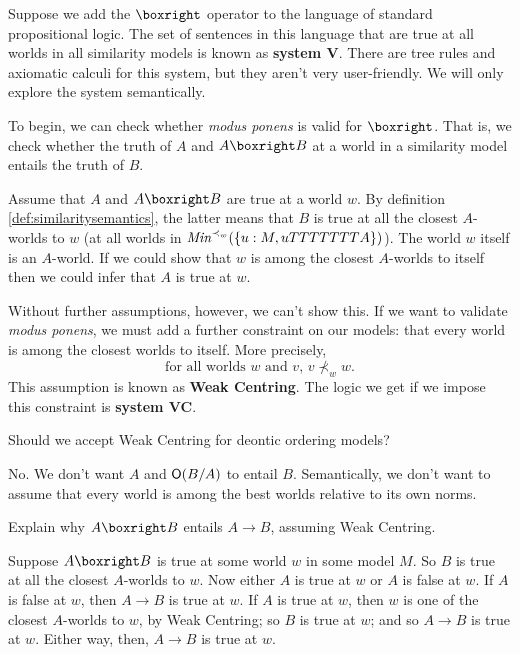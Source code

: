 Suppose we add the $\boxright$ operator to the language of standard
propositional logic. The set of sentences in this language that are true at all
worlds in all similarity models is known as \textbf{system V}. There are tree
rules and axiomatic calculi for this system, but they aren't very user-friendly.
We will only explore the system semantically.

To begin, we can check whether \emph{modus ponens} is valid for $\boxright$. That is,
we check whether the truth of $A$ and $A \boxright B$ at a world in a
similarity model entails the truth of $B$.

Assume that $A$ and $A \boxright B$ are true at a world $w$. By definition
\ref{def:similaritysemantics}, the latter means that $B$ is true at all the
closest $A$-worlds to $w$ (at all worlds in
$\emph{Min}^{\prec_w}(\{u: M,u\models A\})$). The world $w$ itself is an
$A$-world. If we could show that $w$ is among the closest $A$-worlds to itself
then we could infer that $A$ is true at $w$.

Without further assumptions, however, we can't show this. If we want to validate
\emph{modus ponens}, we must add a further constraint on our models: that every
world is among the closest worlds to itself. More precisely,
\[
  \text{for all worlds $w$ and $v$, $v \nprec_{w} w$.}
\]
This assumption is known as \textbf{Weak Centring}.
The logic we get if we impose this constraint is \textbf{system VC}.

\begin{exercise}
  Should we accept Weak Centring for deontic ordering models?
\end{exercise}
\begin{solution}
  No. We don't want $A$ and $\Ob(B/A)$ to entail $B$. Semantically, we don't
  want to assume that every world is among the best worlds relative to its own
  norms.
\end{solution}

\begin{exercise}
  Explain why $A \boxright B$ entails $A \to B$, assuming Weak Centring.
\end{exercise}
\begin{solution}
  Suppose $A \boxright B$ is true at some world $w$ in some model $M$. So $B$ is
  true at all the closest $A$-worlds to $w$. Now either $A$ is true at $w$ or
  $A$ is false at $w$. If $A$ is false at $w$, then $A\to B$ is true at $w$. If
  $A$ is true at $w$, then $w$ is one of the closest $A$-worlds to $w$, by Weak
  Centring; so $B$ is true at $w$; and so $A\to B$ is true at $w$. Either way,
  then, $A\to B$ is true at $w$.
 \end{solution}

